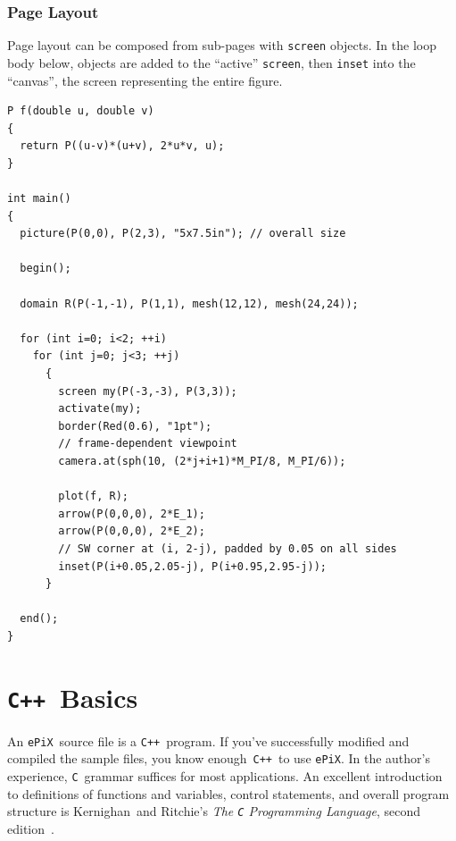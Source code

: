 \documentclass[12pt,letterpaper]{book}
\newcommand{\code}[1]{\texttt{#1}}
\newcommand{\ePiX}{\code{ePiX}}
\newcommand{\CXX}{\code{C++}}
\begin{document}
\begin{center}
  
\end{center}


\subsubsection*{Page Layout}

Page layout can be composed from sub-pages with \code{screen} objects.
In the loop body below, objects are added to the ``active''
\code{screen}, then \code{inset} into the ``canvas'', the screen
representing the entire figure.

\begin{verbatim}
P f(double u, double v)
{
  return P((u-v)*(u+v), 2*u*v, u);
}

int main()
{
  picture(P(0,0), P(2,3), "5x7.5in"); // overall size

  begin();

  domain R(P(-1,-1), P(1,1), mesh(12,12), mesh(24,24));

  for (int i=0; i<2; ++i)
    for (int j=0; j<3; ++j)
      {
        screen my(P(-3,-3), P(3,3));
        activate(my);
        border(Red(0.6), "1pt");
        // frame-dependent viewpoint
        camera.at(sph(10, (2*j+i+1)*M_PI/8, M_PI/6));

        plot(f, R);
        arrow(P(0,0,0), 2*E_1);
        arrow(P(0,0,0), 2*E_2);
        // SW corner at (i, 2-j), padded by 0.05 on all sides
        inset(P(i+0.05,2.05-j), P(i+0.95,2.95-j));
      }

  end();
}
\end{verbatim}

\begin{center}
  
\end{center}


\section{\CXX\ Basics}

\index{Cplusplus@\CXX|(}
An \ePiX\ source file is a \CXX~program. If you've successfully
modified and compiled the sample files, you know enough~\CXX\ to use
\ePiX. In the author's experience, \code{C}~grammar suffices for most
applications.  An excellent introduction to definitions of functions
and variables, control statements, and overall program structure is
Kernighan~and Ritchie's \emph{The \code{C} Programming Language},
second edition~\cite{KnR}.
\end{document}

